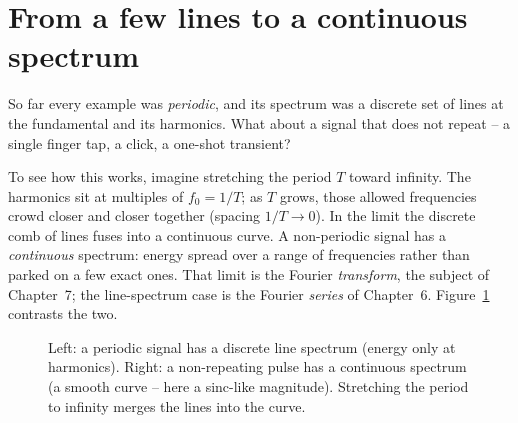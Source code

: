 \section{From a few lines to a continuous spectrum}

So far every example was \emph{periodic}, and its spectrum was a discrete set of
lines at the fundamental and its harmonics. What about a signal that does not repeat
-- a single finger tap, a click, a one-shot transient?

To see how this works, imagine stretching the period $T$ toward infinity. The harmonics
sit at multiples of $f_0 = 1/T$; as $T$ grows, those allowed frequencies crowd closer
and closer together (spacing $1/T \to 0$). In the limit the discrete comb of lines
fuses into a continuous curve. A non-periodic signal has a \emph{continuous} spectrum:
energy spread over a range of frequencies rather than parked on a few exact ones.
That limit is the Fourier \emph{transform}, the subject of Chapter~7; the line-spectrum
case is the Fourier \emph{series} of Chapter~6. Figure~\ref{ch05:disc-to-cont}
contrasts the two.

\begin{figure}[H]
\centering
{}
\caption{Left: a periodic signal has a discrete line spectrum (energy only at
harmonics). Right: a non-repeating pulse has a continuous spectrum (a smooth curve --
here a sinc-like magnitude). Stretching the period to infinity merges the lines into
the curve.}
\label{ch05:disc-to-cont}
\end{figure}

